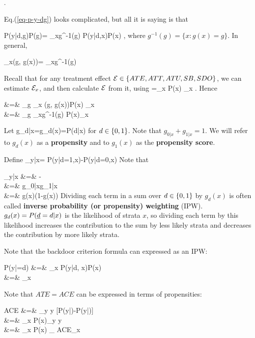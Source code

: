 \beq
{}
\;.
\label{eq-p-y-dg}
\eeq

Eq.(\ref{eq-p-y-dg}) 
looks complicated, but all
it is saying is that

\beq
P(y|d,g)P(g)=
\sum_{x\in g^{-1}(g)}
 P(y|d,x)P(x)
\;,
\eeq
where $g^{-1}(g)=
\{x: g(x)=g\}$.
In general,

\beq
\sum_x\delta(g, g(x))=
\sum_{x\in g^{-1}(g)}
\eeq



Recall that for any treatment
effect ${\cal E}
\in \{ATE, ATT,ATU, SB, SDO\}$, 
we can estimate ${\cal E}_x$,
and then calculate ${\cal E}$ from it, using
\beq
\cale=\sum_x P(x) \cale_x
\;.
\eeq
Hence

\beqa
\cale &=& \sum_g 
\sum_x \delta(g, g(x))P(x)
\cale_{x}
\\
&=&
\sum_g
\sum_{x\in g^{-1}(g)}
P(x)\cale_{x}
\eeqa


Let
\beq
g_{d|x}=g_d(x)=P(d|x)
\eeq
 for $d\in\{0,1\}$.
Note that $g_{0|x}+g_{1|x}=1$.
We will
refer to $g_d(x)$ as a {\bf propensity}
and to $g_1(x)$ as the
{\bf propensity score}.

Define
\beq
\delta_{y|x}=
P(y|d=1,x)-P(y|d=0,x)
\eeq
Note that

\beqa
\delta_{y|x}
&=&
-
\\
&=&
{
g_{0|x}g_{1|x}
}
\\
&=&
{
g(x)(1-g(x))
}
\eeqa
Dividing
each term
in a sum over $d\in \{0,1\}$
by $g_ d(x)$ 
is often called
 {\bf inverse probability (or propensity)
weighting} (IPW).
$g_ d(x)=P({\underline{d}}= d|x)$ is the
likelihood of strata $x$,
so dividing each term by
this likelihood increases the
contribution to the sum
by less likely strata
and decreases the contribution by 
more likely strata.




Note that the 
backdoor criterion formula
can  expressed 
as an IPW:



\beqa
P(y|\rho\rvd=d)
&=&
\sum_x P(y|d, x)P(x)
\\
&=&
\sum_x 
\eeqa

Note that $ATE=ACE$ can be expressed
in terms of propensities:



\beqa
ACE
&=&
\sum_y y [P(y|\rho{})-P(y|\rho{})]
\\
&=&
\sum_x P(x)\sum_y y
\left[
P(y|d=1,x)
-
P(y|d=0,x)
\right]
\\&=&
\sum_x P(x)
_
{ACE_x}
\label{eq-ace-propensity}
\eeqa



